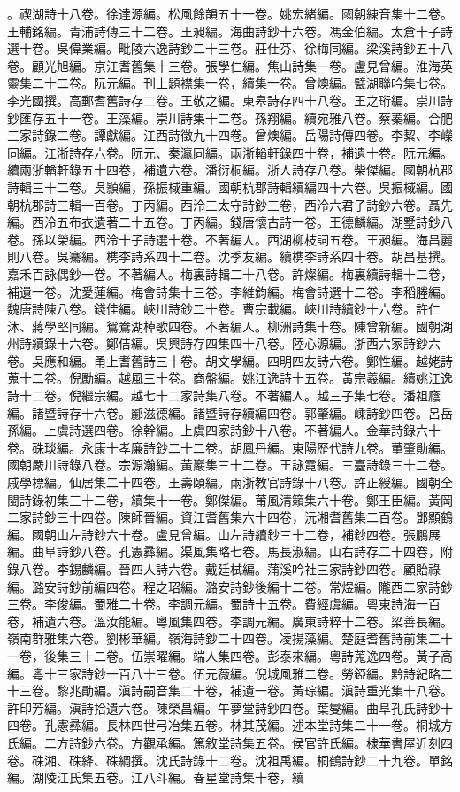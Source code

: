\begin{pinyinscope}
。禊湖詩十八卷。徐達源編。松風餘韻五十一卷。姚宏緒編。國朝練音集十二卷。王輔銘編。青浦詩傳三十二卷。王昶編。海曲詩鈔十六卷。馮金伯編。太倉十子詩選十卷。吳偉業編。毗陵六逸詩鈔二十三卷。莊仕芬、徐梅同編。梁溪詩鈔五十八卷。顧光旭編。京江耆舊集十三卷。張學仁編。焦山詩集一卷。盧見曾編。淮海英靈集二十二卷。阮元編。刊上題襟集一卷，續集一卷。曾燠編。甓湖聯吟集七卷。李光國撰。高郵耆舊詩存二卷。王敬之編。東皋詩存四十八卷。王之珩編。崇川詩鈔匯存五十一卷。王藻編。崇川詩集十二卷。孫翔編。續宛雅八卷。蔡蓁編。合肥三家詩錄二卷。譚獻編。江西詩徵九十四卷。曾燠編。岳陽詩傳四卷。李絜、李嶸同編。江浙詩存六卷。阮元、秦瀛同編。兩浙輶軒錄四十卷，補遺十卷。阮元編。續兩浙輶軒錄五十四卷，補遺六卷。潘衍桐編。浙人詩存八卷。柴傑編。國朝杭郡詩輯三十二卷。吳顥編，孫振棫重編。國朝杭郡詩輯續編四十六卷。吳振棫編。國朝杭郡詩三輯一百卷。丁丙編。西泠三太守詩鈔三卷，西泠六君子詩鈔六卷。聶先編。西泠五布衣遺著二十五卷。丁丙編。錢唐懷古詩一卷。王德麟編。湖墅詩鈔八卷。孫以榮編。西泠十子詩選十卷。不著編人。西湖柳枝詞五卷。王昶編。海昌麗則八卷。吳騫編。槜李詩系四十二卷。沈季友編。續槜李詩系四十卷。胡昌基撰。嘉禾百詠偶鈔一卷。不著編人。梅裏詩輯二十八卷。許燦編。梅裏續詩輯十二卷，補遺一卷。沈愛蓮編。梅會詩集十三卷。李維鈞編。梅會詩選十二卷。李稻塍編。魏唐詩陳八卷。錢佳編。峽川詩鈔二十卷。曹宗載編。峽川詩續鈔十六卷。許仁沐、蔣學堅同編。鴛鴦湖棹歌四卷。不著編人。柳洲詩集十卷。陳曾新編。國朝湖州詩續錄十六卷。鄭佶編。吳興詩存四集四十八卷。陸心源編。浙西六家詩鈔六卷。吳應和編。甬上耆舊詩三十卷。胡文學編。四明四友詩六卷。鄭性編。越姥詩蒐十二卷。倪勵編。越風三十卷。商盤編。姚江逸詩十五卷。黃宗羲編。續姚江逸詩十二卷。倪繼宗編。越七十二家詩集八卷。不著編人。越三子集七卷。潘祖廕編。諸暨詩存十六卷。酈滋德編。諸暨詩存續編四卷。郭肇編。嵊詩鈔四卷。呂岳孫編。上虞詩選四卷。徐幹編。上虞四家詩鈔十八卷。不著編人。金華詩錄六十卷。硃琰編。永康十孝廉詩鈔二十二卷。胡鳳丹編。東陽歷代詩九卷。董肇勛編。國朝嚴川詩錄八卷。宗源瀚編。黃巖集三十二卷。王詠霓編。三臺詩錄三十二卷。戚學標編。仙居集二十四卷。王壽頤編。兩浙教官詩錄十八卷。許正綬編。國朝全閩詩錄初集三十二卷，續集十一卷。鄭傑編。莆風清籟集六十卷。鄭王臣編。黃岡二家詩鈔三十四卷。陳師晉編。資江耆舊集六十四卷，沅湘耆舊集二百卷。鄧顯鶴編。國朝山左詩鈔六十卷。盧見曾編。山左詩續鈔三十二卷，補鈔四卷。張鵬展編。曲阜詩鈔八卷。孔憲彞編。渠風集略七卷。馬長淑編。山右詩存二十四卷，附錄八卷。李錫麟編。晉四人詩六卷。戴廷栻編。蒲溪吟社三家詩鈔四卷。顧貽祿編。潞安詩鈔前編四卷。程之玿編。潞安詩鈔後編十二卷。常煜編。隴西二家詩鈔三卷。李俊編。蜀雅二十卷。李調元編。蜀詩十五卷。費經虞編。粵東詩海一百卷，補遺六卷。溫汝能編。粵風集四卷。李調元編。廣東詩粹十二卷。梁善長編。嶺南群雅集六卷。劉彬華編。嶺海詩鈔二十四卷。凌揚藻編。楚庭耆舊詩前集二十一卷，後集三十二卷。伍崇曜編。端人集四卷。彭泰來編。粵詩蒐逸四卷。黃子高編。粵十三家詩鈔一百八十三卷。伍元薇編。倪城風雅二卷。勞錏編。黔詩紀略二十三卷。黎兆勛編。滇詩嗣音集二十卷，補遺一卷。黃琮編。滇詩重光集十八卷。許印芳編。滇詩拾遺六卷。陳榮昌編。午夢堂詩鈔四卷。葉燮編。曲阜孔氏詩鈔十四卷。孔憲彞編。長林四世弓冶集五卷。林其茂編。述本堂詩集二十一卷。桐城方氏編。二方詩鈔六卷。方觀承編。篤敘堂詩集五卷。侯官許氏編。棣華書屋近刻四卷。硃湘、硃絳、硃綱撰。沈氏詩錄十二卷。沈祖禹編。桐鶴詩鈔二十九卷。單銘編。湖陵江氏集五卷。江八斗編。春星堂詩集十卷，續
\end{pinyinscope}
